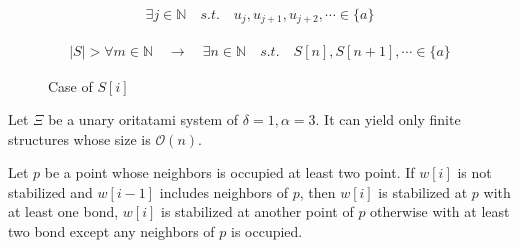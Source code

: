 \documentclass[runningheads]{llncs}
\begin{document}
\begin{eqnarray}
  \exists j \in \mathbb{N} \quad s.t. \quad u_j , u_{j+1} , u_{j+2} , \cdots \in \{ a \}
  \label{TTT_only_a}
\end{eqnarray}

\begin{eqnarray}
  | S | > \forall m \in \mathbb{N} \quad \to \quad \exists n \in \mathbb{N} \quad s.t. \quad S[n], S[n+1], \cdots \in \{ a \}
  \label{TTT_structure}
\end{eqnarray}

\begin{figure}
  \begin{center}
    \caption{Case of $S[i]$}
    \label{TTT_case_of_o}
  \end{center}
\end{figure}

\begin{theorem}[$\delta = 1, \alpha = 3$]
Let $\Xi$ be a unary oritatami system of $\delta = 1, \alpha = 3$. It can yield only finite structures whose size is $\mathcal{O}(n)$.
\end{theorem}

\begin{lemma}
\label{TTT_a3_2b_lemma}
 Let $p$ be a point whose neighbors is occupied at least two point. If $w[i]$ is not stabilized and $w[i-1]$ includes neighbors of $p$, then $w[i]$ is stabilized at $p$ with at least one bond, $w[i]$ is stabilized at another point of $p$ otherwise with at least two bond except any neighbors of $p$ is occupied.
\end{lemma}
\end{document}
